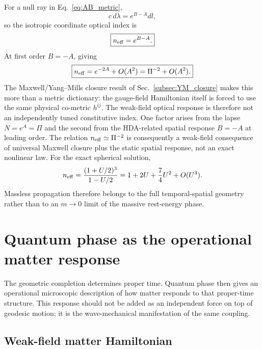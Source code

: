 \documentclass[11pt]{article}
\begin{document}
For a null ray in Eq.~\eqref{eq:AB_metric},
\begin{equation}
    c\,d\lambda=e^{B-A}dl,
\end{equation}
so the isotropic coordinate optical index is
\begin{equation}
    \boxed{n_{\rm eff}=e^{B-A}.}
    \label{eq:neff}
\end{equation}
At first order $B=-A$, giving
\begin{equation}
    \boxed{
    n_{\rm eff}=e^{-2A}+O(A^2)
    =\Pi^{-2}+O(A^2).}
    \label{eq:p2}
\end{equation}
The Maxwell/Yang--Mills closure result of Sec.~\ref{subsec:YM_closure} makes this more than a metric dictionary: the gauge-field Hamiltonian itself is forced to use the same physical co-metric $h^{ij}$. The weak-field optical response is therefore not an independently tuned constitutive index. One factor arises from the lapse $N=e^A=\Pi$ and the second from the HDA-related spatial response $B=-A$ at leading order. The relation $n_{\rm eff}\simeq\Pi^{-2}$ is consequently a weak-field consequence of universal Maxwell closure plus the static spatial response, not an exact nonlinear law. For the exact spherical solution,
\begin{equation}
    n_{\rm eff}
    =\frac{(1+U/2)^3}{1-U/2}
    =1+2U+\frac74U^2+O(U^3).
\end{equation}
Massless propagation therefore belongs to the full temporal-spatial geometry rather than to an $m\to0$ limit of the massive rest-energy phase.

\section{Quantum phase as the operational matter response}

The geometric completion determines proper time. Quantum phase then gives an operational microscopic description of how matter responds to that proper-time structure. This response should not be added as an independent force on top of geodesic motion; it is the wave-mechanical manifestation of the same coupling.

\subsection{Weak-field matter Hamiltonian}
\end{document}
